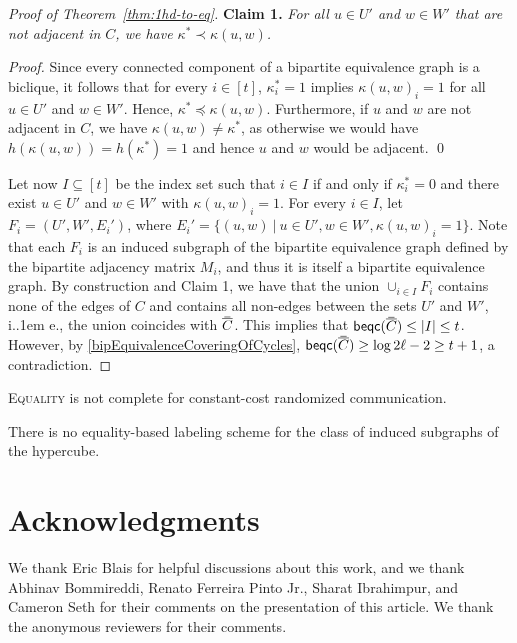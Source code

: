 \documentclass{article}
\makeatletter
\newcommand{\beqc}{\mathsf{beqc}}
\newcommand*\ie{i.\kern.1em e.\@\xspace} %
\newcommand\doverline[1]{%
  \setbox0=\hbox{$\!\overline{#1}\!$}%
  \ht0=\dimexpr\ht0-.2ex\relax%
  \,\overline{\copy0}\,%
}
\newcommand{\bc}[1]{\doverline{#1}} %
\makeatother
\begin{document}
\begin{proof}[Proof of Theorem~\ref{thm:1hd-to-eq}]
	\medskip
	\noindent	
	\textbf{Claim 1.} \emph{For all $u \in U'$ and $w \in W'$ that are \emph{not} adjacent in $C$, we have $\kappa^* \prec \kappa(u,w)$.}
		
	\smallskip
	\noindent
	\emph{Proof.} 
	Since every connected component of a bipartite equivalence graph is a biclique,
	it follows that for every $i \in [t]$, 
	$\kappa^*_i = 1$ implies $\kappa(u,w)_i = 1$ for all $u \in U'$ and $w \in W'$.
	Hence, $\kappa^* \preceq \kappa(u,w)$.
	Furthermore, if $u$ and $w$ are not adjacent in $C$,
	we have $\kappa(u,w) \neq \kappa^*$, as otherwise we would have $h(\kappa(u,w)) = h(\kappa^*) = 1$ and hence $u$ and $w$ would be adjacent. \qed
	
	\medskip
	\noindent
	Let now $I \subseteq [t]$ be the index set such that $i \in I$ if and only if 
	$\kappa^*_i = 0$ and there exist $u \in U'$ and $w \in W'$ with $\kappa(u,w)_i = 1$. 
	For every $i \in I$, let $F_i = (U',W', E_i')$, where
	$E_i' = \{ (u,w) ~|~ u \in U', w \in W', \kappa(u,w)_i = 1\}$. 
	Note that each $F_i$ is an induced subgraph of the bipartite equivalence graph defined by the bipartite adjacency matrix $M_i$, and thus it is itself a bipartite equivalence graph.
	By construction and Claim 1, we have that the union $\cup_{i \in I} F_i$
	contains none of the edges of $C$ and contains all non-edges between the sets $U'$ and $W'$, \ie,
	the union coincides with $\bc{C}$. This implies that $\beqc(\bc{C}) \leq |I| \leq t$. However, by \cref{bipEquivalenceCoveringOfCycles}, $\beqc(\bc{C}) \geq \log 2\ell - 2 \geq t+1$, a contradiction.
\end{proof}


\begin{corollary}
\textsc{Equality} is not complete for constant-cost randomized communication.
\end{corollary}

\begin{corollary}
There is no equality-based labeling scheme for the class of induced subgraphs of the hypercube.
\end{corollary}




\section*{Acknowledgments} 

We thank Eric Blais for helpful discussions about this work, and we thank Abhinav Bommireddi, Renato
Ferreira Pinto Jr., Sharat Ibrahimpur, and Cameron Seth for their comments on the presentation of
this article. We thank the anonymous reviewers for their comments.
\end{document}
